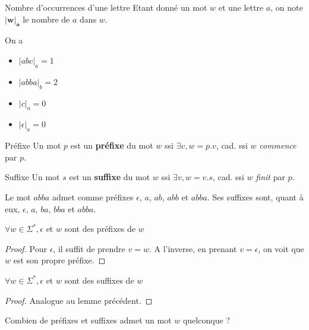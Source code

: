 \begin{definition}{Nombre d'occurrences d'une lettre}{}
Etant donné un mot $w$ et une lettre $a$, on note $\mathbf{|w|_a}$ le nombre de $a$ dans $w$.
\end{definition}

\begin{example}
On a 
\begin{itemize}
    \item $|abc|_a = 1$
    \item $|abba|_b = 2$
    \item $|c|_a = 0$
    \item $|\epsilon|_a = 0$
\end{itemize}
\end{example}

\begin{definition}{Préfixe}{}
Un mot $p$ est un \textbf{préfixe} du mot $w$ ssi $\exists v, w = p.v$, cad. ssi $w$ \textit{commence} par $p$.
\end{definition}

\begin{definition}{Suffixe}{}
Un mot $s$ est un \textbf{suffixe} du mot $w$ ssi $\exists v, w = v.s$, cad. ssi $w$ \textit{finit} par $p$.
\end{definition}

\begin{example}
Le mot $abba$ admet comme préfixes $\epsilon$, $a$, $ab$, $abb$ et $abba$. Ses suffixes sont, quant à eux, $\epsilon$, $a$, $ba$, $bba$ et $abba$.
\end{example}

\begin{lemma}
$\forall w \in \Sigma^*, \epsilon$ et $w$ sont des préfixes de $w$
\end{lemma}
 
\begin{proof}
Pour $\epsilon$, il suffit de prendre $v = w$. A l'inverse, en prenant $v = \epsilon$, on voit que $w$ est son propre préfixe.
\end{proof}

\begin{lemma}
$\forall w \in \Sigma^*, \epsilon$ et $w$ sont des suffixes de $w$
\end{lemma}

\begin{proof}
Analogue au lemme précédent.
\end{proof}


\begin{exercice}\label{expref}
Combien de préfixes et suffixes admet un mot $w$ quelconque ?
\end{exercice}


